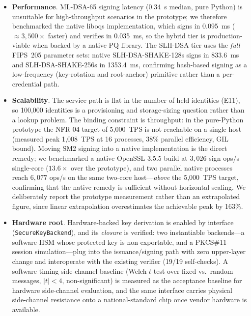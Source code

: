 \documentclass[10pt,twocolumn]{IEEEtran}
\begin{document}
\begin{itemize}
  \item \textbf{Performance}. ML-DSA-65 signing latency (0.34~s median,
    pure Python) is unsuitable for high-throughput scenarios in the
    prototype; we therefore benchmarked the native liboqs
    implementation, which signs in 0.095~ms ($\approx 3{,}500\times$
    faster) and verifies in 0.035~ms, so the hybrid tier is
    production-viable when backed by a native PQ library. The SLH-DSA
    tier uses the \emph{full} FIPS~205 parameter sets: native
    SLH-DSA-SHAKE-128s signs in 833.6~ms and SLH-DSA-SHAKE-256s in
    1353.4~ms, confirming hash-based signing as a low-frequency
    (key-rotation and root-anchor) primitive rather than a
    per-credential path.
  \item \textbf{Scalability}. The service path is flat in the number of
    held identities (E11), so 100,000 identities is a provisioning and
    storage-sizing question rather than a lookup problem. The binding
    constraint is throughput: in the pure-Python prototype the NFR-04
    target of 5,000~TPS is not reachable on a single host (measured
    peak 1,008~TPS at 16 processes, 38\% parallel efficiency, GIL
    bound). Moving SM2 signing into a native implementation is the
    direct remedy; we benchmarked a native OpenSSL 3.5.5 build at
    $3{,}026$ sign ops/s single-core ($13.6\times$ over the
    prototype), and two parallel native processes reach $6{,}077$
    ops/s on the same two-core host---\emph{above} the 5,000~TPS
    target, confirming that the native remedy is sufficient without
    horizontal scaling. We deliberately report the prototype measurement
    rather than an extrapolated figure, since linear extrapolation
    overestimates the achievable peak by 163\%.
  \item \textbf{Hardware root}. Hardware-backed key derivation is enabled
    by interface (\texttt{SecureKeyBackend}), and its \emph{closure} is
    verified: two instantiable backends---a software-HSM whose protected
    key is non-exportable, and a PKCS\#11-session simulation---plug into
    the issuance/signing path with zero upper-layer change and
    interoperate with the existing verifier (19/19 self-checks). A
    software timing side-channel baseline (Welch $t$-test over fixed vs.\
    random messages, $|t|<4$, non-significant) is measured as the
    acceptance baseline for hardware side-channel evaluation, and the
    same interface carries physical side-channel resistance onto a
    national-standard chip once vendor hardware is available.

\end{itemize}
\end{document}
